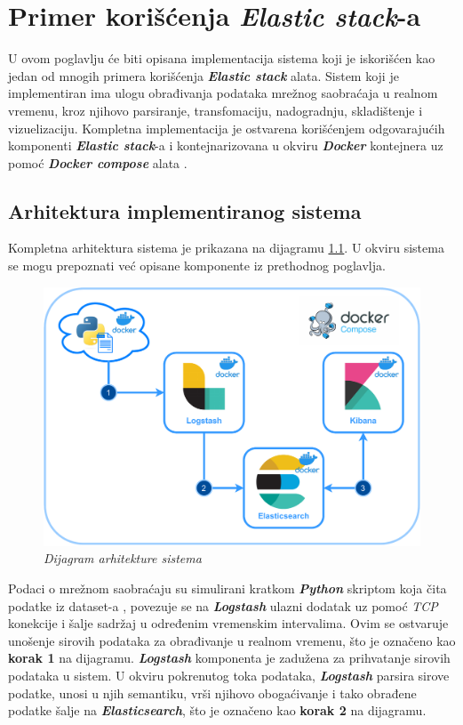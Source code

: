 \chapter{Primer korišćenja \textit{Elastic stack}-a}
U ovom poglavlju će biti opisana implementacija sistema koji je iskorišćen kao jedan od mnogih primera korišćenja \textit{\textbf{Elastic stack}} alata. Sistem koji je implementiran ima ulogu obrađivanja podataka mrežnog saobraćaja u realnom vremenu, kroz njihovo parsiranje, transfomaciju, nadogradnju, skladištenje i vizuelizaciju. Kompletna implementacija je ostvarena korišćenjem odgovarajućih komponenti \textit{\textbf{Elastic stack}}-a i kontejnarizovana u okviru \textit{\textbf{Docker}} \cite{docker} kontejnera uz pomoć \textit{\textbf{Docker compose}} alata \cite{docker-compose}. 

\section{Arhitektura implementiranog sistema} 
Kompletna arhitektura sistema je prikazana na dijagramu \ref{diagram:arhitektura-sistema-primera-koriscenja}. U okviru sistema se mogu prepoznati već opisane komponente iz prethodnog poglavlja.

\begin{figure}[H]
    \centering
    \includegraphics[width=\columnwidth]{images/Impl-arch.pdf}
    \caption{\textit{Dijagram arhitekture sistema}}
    \label{diagram:arhitektura-sistema-primera-koriscenja}
\end{figure}

\par
Podaci o mrežnom saobraćaju su simulirani kratkom \textit{\textbf{Python}} skriptom koja čita podatke iz dataset-a \cite{dataset}, povezuje se na \textit{\textbf{Logstash}} ulazni dodatak uz pomoć \textit{TCP} konekcije i šalje sadržaj u određenim vremenskim intervalima. Ovim se ostvaruje unošenje sirovih podataka za obrađivanje u realnom vremenu, što je označeno kao \textbf{korak 1} na dijagramu. \textit{\textbf{Logstash}} komponenta je zadužena za prihvatanje sirovih podataka u sistem. U okviru pokrenutog toka podataka, \textit{\textbf{Logstash}} parsira sirove podatke, unosi u njih semantiku, vrši njihovo obogaćivanje i tako obrađene podatke šalje na \textit{\textbf{Elasticsearch}}, što je označeno kao \textbf{korak 2} na dijagramu.

